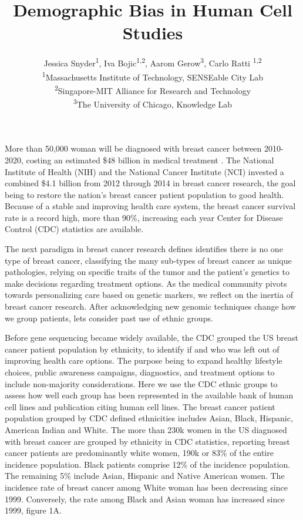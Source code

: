 \documentclass[11pt]{article}
\begin{document}
\title{Demographic Bias in Human Cell Studies }
\author{Jessica Snyder\textsuperscript{1}, Iva Bojic\textsuperscript{1,2}, Aarom Gerow\textsuperscript{3}, Carlo Ratti  \textsuperscript{1,2 } \\ \textsuperscript{1}Massachusetts Institute of Technology, SENSEable City Lab \\ \textsuperscript{2}Singapore-MIT Alliance for Research and Technology \\  \textsuperscript{3}The University of Chicago, Knowledge Lab }

\maketitle 

More than 50,000 woman will be diagnosed with breast cancer between 2010-2020, costing an estimated \$48 billion in medical treatment \cite{mariotto2011projections, weir2015past}.  The National Institute of Health (NIH) and the National Cancer Institute (NCI) invested a combined \$4.1 billion from 2012 through 2014  in breast cancer research, the goal being to restore the nation's breast cancer patient population to good health. Because of a stable and improving health care system, the breast cancer survival rate is a record high, more than 90\%, increasing each year Center for Disease Control (CDC) statistics are available. 

The next paradigm in breast cancer research defines identifies there is no one type of breast cancer, classifying the many sub-types of breast cancer as unique pathologies, relying on specific traits of the tumor and the patient's genetics to make decisions regarding treatment options. As the medical community pivots towards personalizing care based on genetic markers, we reflect on the inertia of breast cancer research. After acknowledging new genomic techniques change how we group patients, lets consider past use of ethnic groups. 

Before gene sequencing became widely available, the CDC grouped the US breast cancer patient population by ethnicity, to identify if and who was left out of improving health care options. The purpose being to expand healthy lifestyle choices, public awareness campaigns, diagnostics, and treatment options to include non-majority considerations. Here we use the CDC ethnic groups to assess how well each group has been represented in the available bank of human cell lines and publication citing human cell lines. The breast cancer patient population grouped by CDC defined ethnicities includes Asian, Black, Hispanic, American Indian and White. The more than 230k women in the US diagnosed with breast cancer are grouped by ethnicity in CDC statistics, reporting breast cancer patients are predominantly white women, 190k or 83\% of the entire incidence population. Black patients comprise 12\% of the incidence population. The remaining 5\% include Asian, Hispanic and Native American women. The incidence rate of breast cancer among White woman has been decreasing since 1999. Conversely, the rate among Black and Asian woman has increased since 1999, figure 1A. 
\end{document}
